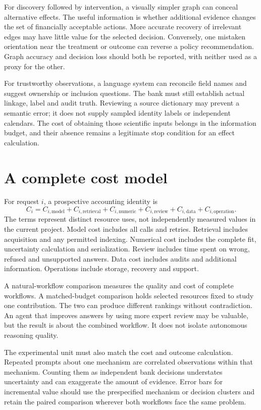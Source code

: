 For discovery followed by intervention, a visually simpler graph can conceal
alternative effects. The useful information is whether additional evidence
changes the set of financially acceptable actions. More accurate recovery of
irrelevant edges may have little value for the selected decision. Conversely,
one mistaken orientation near the treatment or outcome can reverse a policy
recommendation. Graph accuracy and decision loss should both be reported, with
neither used as a proxy for the other.

For trustworthy observations, a language system can reconcile field names and
suggest ownership or inclusion questions. The bank must still establish actual
linkage, label and audit truth. Reviewing a source dictionary may prevent a
semantic error; it does not supply sampled identity labels or independent
calendars. The cost of obtaining those scientific inputs belongs in the
information budget, and their absence remains a legitimate stop condition for
an effect calculation.

\section{A complete cost model}

For request $i$, a prospective accounting identity is
\[
 C_i=C_{i,\mathrm{model}}+C_{i,\mathrm{retrieval}}+
     C_{i,\mathrm{numeric}}+C_{i,\mathrm{review}}+
     C_{i,\mathrm{data}}+C_{i,\mathrm{operation}}.
\]
The terms represent distinct resource uses, not independently measured values
in the current project. Model cost includes all calls and retries. Retrieval
includes acquisition and any permitted indexing. Numerical cost includes the
complete fit, uncertainty calculation and serialization. Review includes time
spent on wrong, refused and unsupported answers. Data cost includes audits and
additional information. Operations include storage, recovery and support.

A natural-workflow comparison measures the quality and cost of complete
workflows. A matched-budget comparison holds selected resources fixed to study
one contribution. The two can produce different rankings without contradiction.
An agent that improves answers by using more expert review may be valuable,
but the result is about the combined workflow. It does not isolate autonomous
reasoning quality.

The experimental unit must also match the cost and outcome calculation.
Repeated prompts about one mechanism are correlated observations within that
mechanism. Counting them as independent bank decisions understates uncertainty
and can exaggerate the amount of evidence. Error bars for incremental value
should use the prespecified mechanism or decision clusters and retain the
paired comparison wherever both workflows face the same problem.

